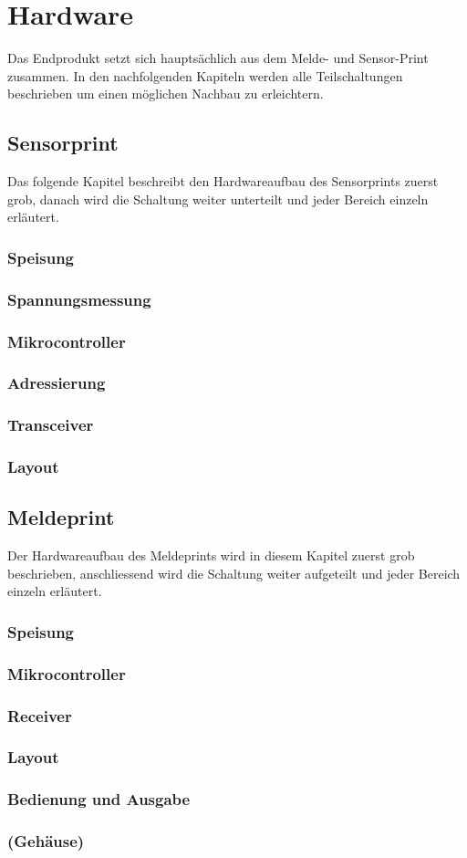 \section{Hardware}
Das Endprodukt setzt sich hauptsächlich aus dem Melde- und Sensor-Print zusammen. In den nachfolgenden Kapiteln werden alle Teilschaltungen beschrieben um einen möglichen Nachbau zu erleichtern.
\subsection{Sensorprint}
Das folgende Kapitel beschreibt den Hardwareaufbau des Sensorprints zuerst grob, danach wird die Schaltung weiter unterteilt und jeder Bereich einzeln erläutert.
\subsubsection{Speisung}
\subsubsection{Spannungsmessung}
\subsubsection{Mikrocontroller}
\subsubsection{Adressierung}
\subsubsection{Transceiver}
\subsubsection{Layout}
\subsection{Meldeprint}
Der Hardwareaufbau des Meldeprints wird in diesem Kapitel zuerst grob beschrieben, anschliessend wird die Schaltung weiter aufgeteilt und jeder Bereich einzeln erläutert.
\subsubsection{Speisung}
\subsubsection{Mikrocontroller}
\subsubsection{Receiver}
\subsubsection{Layout}
\subsubsection{Bedienung und Ausgabe}
\subsubsection{(Gehäuse)}